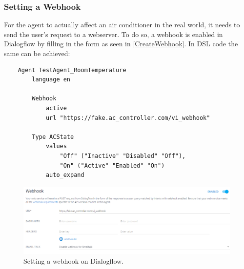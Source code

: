 \subsubsection{Setting a Webhook}
For the agent to actually affect an air conditioner in the real world, it needs to send the user's request to a webserver. To do so, a webhook is enabled in Dialogflow by filling in the form as seen in \autoref{CreateWebhook}.
In DSL code the same can be achieved:
\begin{samepage}
    \begin{verbatim}
    Agent TestAgent_RoomTemperature
        language en 
            
        Webhook 
            active 
            url "https://fake.ac_controller.com/vi_webhook"

        Type ACState
            values 
                "Off" ("Inactive" "Disabled" "Off"),
                "On" ("Active" "Enabled" "On")
            auto_expand
    \end{verbatim}
\end{samepage}

\begin{figure}[ht]
    \centering
    \includegraphics[width=1\textwidth]{Thesis_Images/CreateWebhook.PNG}
    \caption{Setting a webhook on Dialogflow.}
        \label{CreateWebhook}
\end{figure}

